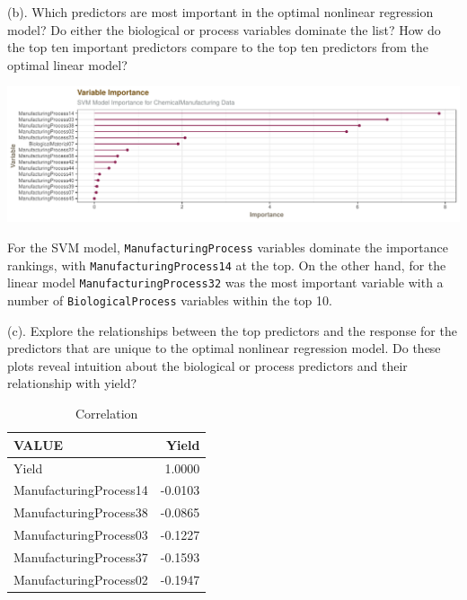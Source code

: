 \documentclass[]{report}
\begin{document}
\begin{subquestion}{(b).}
Which predictors are most important in the optimal nonlinear regression model? Do either the biological or process variables dominate the list? How do the top ten important predictors compare to the top ten predictors from the optimal linear model? 
\end{subquestion}

\includegraphics{Homework-Two2_files/figure-latex/kj-7.5b-1.pdf}

For the SVM model, \texttt{ManufacturingProcess} variables dominate the
importance rankings, with \texttt{ManufacturingProcess14} at the top. On
the other hand, for the linear model \texttt{ManufacturingProcess32} was
the most important variable with a number of \texttt{BiologicalProcess}
variables within the top 10.

\begin{subquestion}{(c).}
Explore the relationships between the top predictors and the response for the predictors that are unique to the optimal nonlinear regression model. Do these plots reveal intuition about the biological or process predictors and their relationship with yield?
\end{subquestion}

\begin{table}[H]

\caption{\label{tab:unnamed-chunk-1}Correlation}
\centering
\fontsize{8}{10}\selectfont
\begin{tabular}[t]{l|r}
\hline
VALUE & Yield\\
\hline
\rowcolor{gray!6}  Yield & 1.0000\\
\hline
ManufacturingProcess14 & -0.0103\\
\hline
\rowcolor{gray!6}  ManufacturingProcess38 & -0.0865\\
\hline
ManufacturingProcess03 & -0.1227\\
\hline
\rowcolor{gray!6}  ManufacturingProcess37 & -0.1593\\
\hline
ManufacturingProcess02 & -0.1947\\
\hline
\end{tabular}
\end{table}
\end{document}
